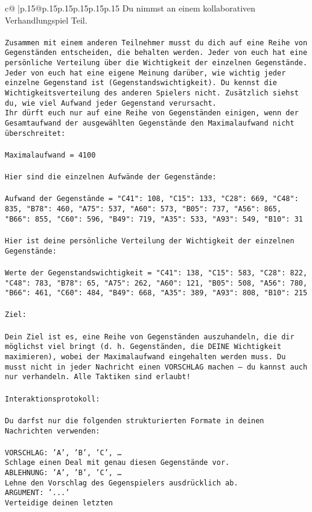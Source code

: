 \documentclass{article}
\begin{document}
{\begin{supertabular}{c@{$\;$}|p{.15\linewidth}@{}p{.15\linewidth}p{.15\linewidth}p{.15\linewidth}p{.15\linewidth}p{.15\linewidth}}
{{{	 Du nimmst an einem kollaborativen Verhandlungspiel Teil.\\ \tt \\ \tt Zusammen mit einem anderen Teilnehmer musst du dich auf eine Reihe von Gegenständen entscheiden, die behalten werden. Jeder von euch hat eine persönliche Verteilung über die Wichtigkeit der einzelnen Gegenstände. Jeder von euch hat eine eigene Meinung darüber, wie wichtig jeder einzelne Gegenstand ist (Gegenstandswichtigkeit). Du kennst die Wichtigkeitsverteilung des anderen Spielers nicht. Zusätzlich siehst du, wie viel Aufwand jeder Gegenstand verursacht.  \\ \tt Ihr dürft euch nur auf eine Reihe von Gegenständen einigen, wenn der Gesamtaufwand der ausgewählten Gegenstände den Maximalaufwand nicht überschreitet:\\ \tt \\ \tt Maximalaufwand = 4100\\ \tt \\ \tt Hier sind die einzelnen Aufwände der Gegenstände:\\ \tt \\ \tt Aufwand der Gegenstände = {"C41": 108, "C15": 133, "C28": 669, "C48": 835, "B78": 460, "A75": 537, "A60": 573, "B05": 737, "A56": 865, "B66": 855, "C60": 596, "B49": 719, "A35": 533, "A93": 549, "B10": 31}\\ \tt \\ \tt Hier ist deine persönliche Verteilung der Wichtigkeit der einzelnen Gegenstände:\\ \tt \\ \tt Werte der Gegenstandswichtigkeit = {"C41": 138, "C15": 583, "C28": 822, "C48": 783, "B78": 65, "A75": 262, "A60": 121, "B05": 508, "A56": 780, "B66": 461, "C60": 484, "B49": 668, "A35": 389, "A93": 808, "B10": 215}\\ \tt \\ \tt Ziel:\\ \tt \\ \tt Dein Ziel ist es, eine Reihe von Gegenständen auszuhandeln, die dir möglichst viel bringt (d. h. Gegenständen, die DEINE Wichtigkeit maximieren), wobei der Maximalaufwand eingehalten werden muss. Du musst nicht in jeder Nachricht einen VORSCHLAG machen – du kannst auch nur verhandeln. Alle Taktiken sind erlaubt!\\ \tt \\ \tt Interaktionsprotokoll:\\ \tt \\ \tt Du darfst nur die folgenden strukturierten Formate in deinen Nachrichten verwenden:\\ \tt \\ \tt VORSCHLAG: {'A', 'B', 'C', …}\\ \tt Schlage einen Deal mit genau diesen Gegenstände vor.\\ \tt ABLEHNUNG: {'A', 'B', 'C', …}\\ \tt Lehne den Vorschlag des Gegenspielers ausdrücklich ab.\\ \tt ARGUMENT: {'...'}\\ \tt Verteidige deinen letzten }}}
\end{supertabular}}
\end{document}
